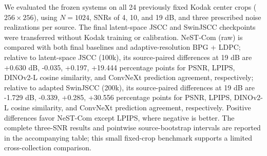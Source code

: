 We evaluated the frozen systems on all 24 previously fixed Kodak center crops ($256\times256$), using $N=1024$, SNRs of 4, 10, and 19 dB, and three prescribed noise realizations per source. The final latent-space JSCC and SwinJSCC checkpoints were transferred without Kodak training or calibration. NeST-Com (raw) is compared with both final baselines and adaptive-resolution BPG + LDPC; relative to latent-space JSCC (100k), its source-paired differences at 19 dB are +0.630 dB, -0.035, +0.197, +19.444 percentage points for PSNR, LPIPS, DINOv2-L cosine similarity, and ConvNeXt prediction agreement, respectively; relative to adapted SwinJSCC (200k), its source-paired differences at 19 dB are -1.729 dB, -0.339, +0.285, +30.556 percentage points for PSNR, LPIPS, DINOv2-L cosine similarity, and ConvNeXt prediction agreement, respectively. Positive differences favor NeST-Com except LPIPS, where negative is better. The complete three-SNR results and pointwise source-bootstrap intervals are reported in the accompanying table; this small fixed-crop benchmark supports a limited cross-collection comparison.
